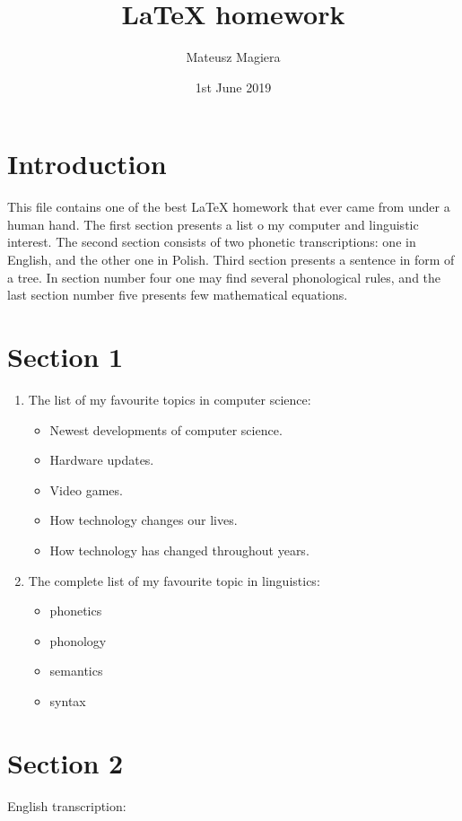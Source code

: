 \documentclass{article}
\title{\LaTeX{} homework}
\author{Mateusz Magiera }
\date{1st June  2019}
\begin{document}
\maketitle

\section{Introduction}
This file contains one of the best LaTeX homework that ever came from under a human hand. The first section presents a list o my computer and linguistic interest. The second section consists of two phonetic  transcriptions: one in English, and the other one in Polish. Third section presents a sentence in form of a tree. In section number four one may find several phonological rules, and the last section number five presents few mathematical equations.
\section{Section 1}
\begin{enumerate}
   \item The list of my favourite topics in computer science:
   \begin{itemize}
     \item Newest developments of computer science.
     \item Hardware updates.
     \item Video games.
     \item How technology changes our lives.
     \item How technology has changed throughout years.
   \end{itemize}
   \item The complete list of my favourite topic in linguistics:
   \begin{itemize}
       \item phonetics
       \item phonology
       \item semantics
       \item syntax
   \end{itemize}
\end{enumerate}

\newpage \section{Section 2}
 English transcription:\newline
{}
\end{document}
